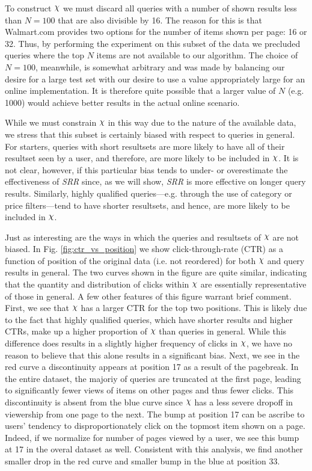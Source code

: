 \documentclass{article}
\def\Chi{\raisebox{2pt}{$\chi$}}
\begin{document}
To construct $\Chi$ we  must discard all queries with a number of shown results
less than $N=100$ that are also divisible by 16. The reason for this is that
Walmart.com provides two options for the number of items shown per page: 16 or
32. Thus, by performing the experiment on this subset of the data we precluded
queries where the top $N$ items are not available to our algorithm.  The choice
of $N=100$, meanwhile, is somewhat arbitrary and was made by balancing our
desire for a large test set with our desire to use a value appropriately large
for an online implementation. It is therefore quite possible that a larger value
of $N$ (e.g. 1000) would achieve better results in the actual online scenario.

While we must constrain $\Chi$ in this way due to the nature of the available
data, we stress that this subset is certainly biased with respect to queries in
general. For starters, queries with short resultsets are more likely to have all
of their resultset seen by a user, and therefore, are more likely to be included
in $\Chi$. It is not clear, however, if this particular bias tends to under- or
overestimate the effectiveness of {\em SRR} since, as we will show, {\em SRR} is
more effective on longer query results. Similarly, highly qualified
queries---e.g. through the use of category or price filters---tend to have
shorter resultsets, and hence, are more likely to be included in $\Chi$.

Just as interesting are the ways in which the queries and resultsets of $\Chi$
are not biased. In Fig. \ref{fig:ctr_vs_position} we show click-through-rate
(CTR) as a function of position of the original data (i.e. not reordered) for
both $\Chi$ and query results in general. The two curves shown in the figure are
quite similar, indicating that the quantity and distribution of clicks within
$\Chi$ are essentially representative of those in general. A few other features
of this figure warrant brief comment. First, we see that $\Chi$ has a larger CTR
for the top two positions. This is likely due to the fact that highly qualified
queries, which have shorter results and higher CTRs,  make up a higher
proportion of $\Chi$ than queries in general. While this difference does results
in a slightly higher frequency of clicks in $\Chi$, we have no reason to believe
that this alone results in a significant bias. Next, we see in the red curve a
discontinuity appears at position 17 as a result of the pagebreak. In the entire
dataset, the majoriy of queries are truncated at the first page, leading to
significantly fewer views of items on other pages and thus fewer clicks. This
discontinuity is absent from the blue curve since $\Chi$ has a less severe
dropoff in viewership from one page to the next.  The bump at position 17 can be
ascribe to users' tendency to disproportionately click on the topmost item shown
on a page. Indeed, if we normalize for number of pages viewed by a user, we see
this bump at 17 in the overal dataset as well. Consistent with this analysis, we
find another smaller drop in the red curve and smaller bump in the blue at
position 33.
\end{document}

